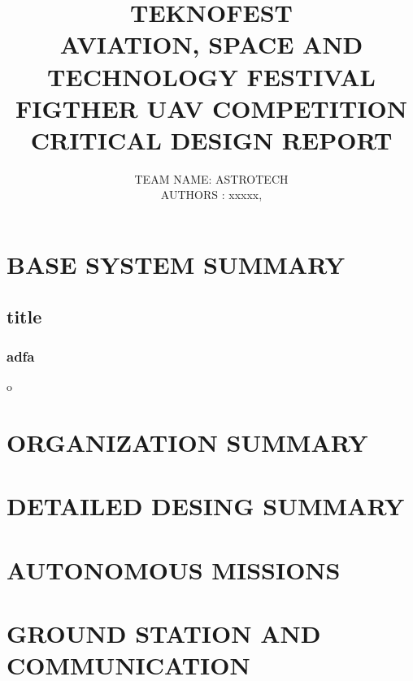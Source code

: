 \documentclass[12pt]{article}
\begin{document}
\begin{titlepage}
	\centering
	\title{ %
		TEKNOFEST \\
		AVIATION, SPACE AND TECHNOLOGY FESTIVAL \\
		FIGTHER UAV COMPETITION \\
		CRITICAL DESIGN REPORT \\}
	\author{
		TEAM NAME: ASTROTECH \\
		AUTHORS : xxxxx,\\} %
	\date{}
	\maketitle
\end{titlepage}	

\clearpage
{}
\tableofcontents %

\clearpage

\section{BASE SYSTEM SUMMARY}
\subsection{title}
\subsubsection{adfa}
\cite[reference citation.]{greenwade93}o
\blindtext
\Blindtext
\section{ORGANIZATION SUMMARY}

\section{DETAILED DESING SUMMARY}

\section{AUTONOMOUS MISSIONS}

\section{GROUND STATION AND COMMUNICATION}
\end{document}
